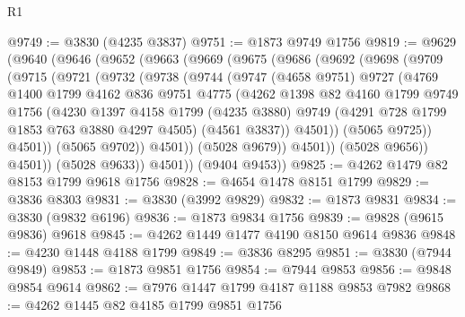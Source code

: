 \begin{lexlean}{R1}
\begin{coremodule}
@9749 := @3830 (@4235 @3837)
@9751 := @1873 @9749 @1756
@9819 := @9629
    (@9640
      (@9646
        (@9652
          (@9663
            (@9669
              (@9675
                (@9686
                  (@9692
                    (@9698
                      (@9709
                        (@9715
                          (@9721
                            (@9732
                              (@9738
                                (@9744
                                  (@9747
                                    (@4658 @9751)
                                    @9727
                                    (@4769
                                      @1400
                                      @1799
                                      @4162
                                      @836
                                      @9751
                                      @4775
                                      (@4262
                                        @1398
                                        @82
                                        @4160
                                        @1799
                                        @9749
                                        @1756
                                        (@4230
                                          @1397
                                          @4158
                                          @1799
                                          (@4235 @3880)
                                          @9749
                                          (@4291 @728 @1799 @1853 @763 @3880 @4297 @4505)
                                          (@4561 @3837))
                                        @4501))
                                    (@5065 @9725))
                                  @4501))
                              (@5065 @9702))
                            @4501))
                        (@5028 @9679))
                      @4501))
                  (@5028 @9656))
                @4501))
            (@5028 @9633))
          @4501))
      (@9404 @9453))
@9825 := @4262 @1479 @82 @8153 @1799 @9618 @1756
@9828 := @4654 @1478 @8151 @1799
@9829 := @3836 @8303
@9831 := @3830 (@3992 @9829)
@9832 := @1873 @9831
@9834 := @3830 (@9832 @6196)
@9836 := @1873 @9834 @1756
@9839 := @9828 (@9615 @9836) @9618
@9845 := @4262 @1449 @1477 @4190 @8150 @9614 @9836
@9848 := @4230 @1448 @4188 @1799
@9849 := @3836 @8295
@9851 := @3830 (@7944 @9849)
@9853 := @1873 @9851 @1756
@9854 := @7944 @9853
@9856 := @9848 @9854 @9614
@9862 := @7976 @1447 @1799 @4187 @1188 @9853 @7982
@9868 := @4262 @1445 @82 @4185 @1799 @9851 @1756

\end{coremodule}
\end{lexlean}
